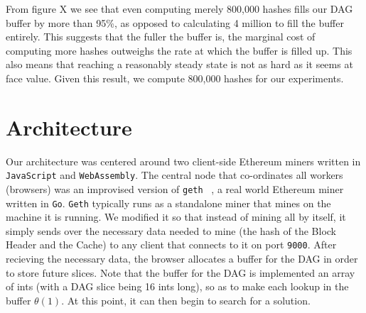 \documentclass[runningheads]{llncs}
\begin{document}
From figure X we see that even computing merely 800,000 hashes fills our DAG buffer by more than 95\%, as opposed to calculating 4 million to fill the buffer entirely. This suggests that the fuller the buffer is, the marginal cost of computing more hashes outweighs the rate at which the buffer is filled up. This also means that reaching a reasonably steady state is not as hard as it seems at face value. Given this result, we compute 800,000 hashes for our experiments.

\section{Architecture}

Our architecture was centered around two client-side Ethereum miners written in \verb|JavaScript| and \verb|WebAssembly|. The central node that co-ordinates all workers (browsers) was an improvised version of \verb|geth| ~\cite{geth}, a real world Ethereum miner written in \verb|Go|. \verb|Geth| typically runs as a standalone miner that mines on the machine it is running. We modified it so that instead of mining all by itself, it simply sends over the necessary data needed to mine (the hash of the Block Header and the Cache) to any client that connects to it on port \verb|9000|. After recieving the necessary data, the browser allocates a buffer for the DAG in order to store future slices. Note that the buffer for the DAG is implemented an array of ints (with a DAG slice being 16 ints long), so as to make each lookup in the buffer $\theta(1)$. At this point, it can then begin to search for a solution. 
\end{document}
